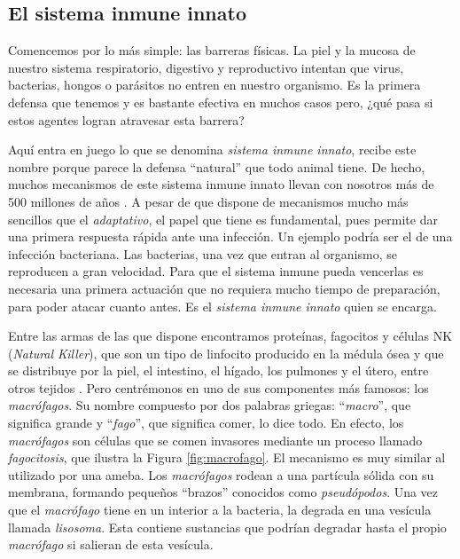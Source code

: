 \subsection{El sistema inmune innato}

Comencemos por lo más simple: las barreras físicas. La piel y la mucosa de nuestro sistema respiratorio, digestivo y reproductivo intentan que virus, bacterias, hongos o parásitos no entren en nuestro organismo. Es la primera defensa que tenemos y es bastante efectiva en muchos casos pero, ¿qué pasa si estos agentes logran atravesar esta barrera?

Aquí entra en juego lo que se denomina \textit{sistema inmune innato}, recibe este nombre porque parece la defensa ``natural'' que todo animal tiene. De hecho, muchos mecanismos de este sistema inmune innato llevan con nosotros más de 500 millones de años \citep{theHowItWorks}. A pesar de que dispone de mecanismos mucho más sencillos que el \textit{adaptativo}, el papel que tiene es fundamental, pues permite dar una primera respuesta rápida ante una infección. Un ejemplo podría ser el de una infección bacteriana. Las bacterias, una vez que entran al organismo, se reproducen a gran velocidad. Para que el sistema inmune pueda vencerlas es necesaria una primera actuación que no requiera mucho tiempo de preparación, para poder atacar cuanto antes. Es el \textit{sistema inmune innato} quien se encarga. 

Entre las armas de las que dispone encontramos proteínas, fagocitos y células NK (\textit{Natural Killer}), que son un tipo de linfocito producido en la médula ósea y que se distribuye por la piel, el intestino, el hígado, los pulmones y el útero, entre otros tejidos \citep{celulasNK}. Pero centrémonos en uno de sus componentes más famosos: los \textit{macrófagos}. Su nombre compuesto por dos palabras griegas: ``\textit{macro}'', que significa grande y ``\textit{fago}'', que significa comer, lo dice todo. En efecto, los \textit{macrófagos} son células que se comen invasores mediante un proceso llamado \textit{fagocitosis}, que ilustra la Figura \ref{fig:macrofago}. El mecanismo es muy similar al utilizado por una ameba. Los \textit{macrófagos} rodean a una partícula sólida con su membrana, formando pequeños ``brazos'' conocidos como \textit{pseudópodos}. Una vez que el \textit{macrófago} tiene en un interior a la bacteria, la degrada en una vesícula llamada \textit{lisosoma}. Esta contiene sustancias que podrían degradar hasta el propio \textit{macrófago} si salieran de esta vesícula. 



